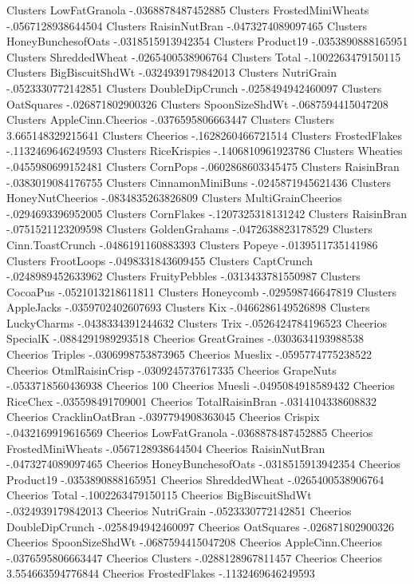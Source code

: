 Clusters	LowFatGranola	-.0368878487452885
Clusters	FrostedMiniWheats	-.0567128938644504
Clusters	RaisinNutBran	-.0473274089097465
Clusters	HoneyBunchesofOats	-.0318515913942354
Clusters	Product19	-.0353890888165951
Clusters	ShreddedWheat	-.0265400538906764
Clusters	Total	-.1002263479150115
Clusters	BigBiscuitShdWt	-.0324939179842013
Clusters	NutriGrain	-.0523330772142851
Clusters	DoubleDipCrunch	-.0258494942460097
Clusters	OatSquares	-.026871802900326
Clusters	SpoonSizeShdWt	-.0687594415047208
Clusters	AppleCinn.Cheerios	-.0376595806663447
Clusters	Clusters	3.665148329215641
Clusters	Cheerios	-.1628260466721514
Clusters	FrostedFlakes	-.1132469646249593
Clusters	RiceKrispies	-.1406810961923786
Clusters	Wheaties	-.0455980699152481
Clusters	CornPops	-.0602868603345475
Clusters	RaisinBran	-.0383019084176755
Clusters	CinnamonMiniBuns	-.0245871945621436
Clusters	HoneyNutCheerios	-.0834835263826809
Clusters	MultiGrainCheerios	-.0294693396952005
Clusters	CornFlakes	-.1207325318131242
Clusters	RaisinBran	-.0751521123209598
Clusters	GoldenGrahams	-.0472638823178529
Clusters	Cinn.ToastCrunch	-.0486191160883393
Clusters	Popeye	-.0139511735141986
Clusters	FrootLoops	-.0498331843609455
Clusters	CaptCrunch	-.0248989452633962
Clusters	FruityPebbles	-.0313433781550987
Clusters	CocoaPus	-.0521013218611811
Clusters	Honeycomb	-.029598746647819
Clusters	AppleJacks	-.0359702402607693
Clusters	Kix	-.0466286149526898
Clusters	LuckyCharms	-.0438334391244632
Clusters	Trix	-.0526424784196523
Cheerios	SpecialK	-.0884291989293518
Cheerios	GreatGraines	-.0303634193988538
Cheerios	Triples	-.0306998753873965
Cheerios	Mueslix	-.0595774775238522
Cheerios	OtmlRaisinCrisp	-.0309245737617335
Cheerios	GrapeNuts	-.0533718560436938
Cheerios	100%
Cheerios	Muesli	-.0495084918589432
Cheerios	RiceChex	-.035598491709001
Cheerios	TotalRaisinBran	-.0314104338608832
Cheerios	CracklinOatBran	-.0397794908363045
Cheerios	Crispix	-.0432169919616569
Cheerios	LowFatGranola	-.0368878487452885
Cheerios	FrostedMiniWheats	-.0567128938644504
Cheerios	RaisinNutBran	-.0473274089097465
Cheerios	HoneyBunchesofOats	-.0318515913942354
Cheerios	Product19	-.0353890888165951
Cheerios	ShreddedWheat	-.0265400538906764
Cheerios	Total	-.1002263479150115
Cheerios	BigBiscuitShdWt	-.0324939179842013
Cheerios	NutriGrain	-.0523330772142851
Cheerios	DoubleDipCrunch	-.0258494942460097
Cheerios	OatSquares	-.026871802900326
Cheerios	SpoonSizeShdWt	-.0687594415047208
Cheerios	AppleCinn.Cheerios	-.0376595806663447
Cheerios	Clusters	-.0288128967811457
Cheerios	Cheerios	3.554663594776844
Cheerios	FrostedFlakes	-.1132469646249593
